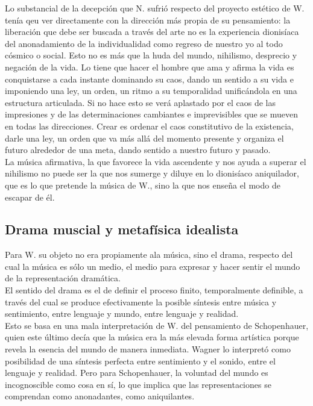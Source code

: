 \documentclass[a4paper, 10pt, twocolumn, spanish]{article}
\begin{document}
Lo substancial de la decepción que N. sufrió respecto del proyecto
estético de W. tenía qeu ver directamente con la dirección más propia
de su pensamiento: la liberación que debe ser buscada a través del
arte no es la experiencia dionisíaca del anonadamiento de la
individualidad como regreso de nuestro yo al todo cósmico o
social. Esto no es más que la huda del mundo, nihilismo, desprecio y
negación de la vida. Lo tiene que hacer el hombre que ama y afirma la
vida es conquistarse a cada instante dominando su caos, dando un
sentido a su vida e imponiendo una ley, un orden, un ritmo a su
temporalidad unificándola en una estructura articulada. Si no hace
esto se verá aplastado por el caos de las impresiones y de las
determinaciones cambiantes e imprevisibles que se mueven en todas las
direcciones. Crear es ordenar el caos constitutivo de la existencia,
darle una ley, un orden que va más allá del momento presente y
organiza el futuro alrededor de una meta, dando sentido a nuestro
futuro y pasado.\\[0pt]
La música afirmativa, la que favorece la vida ascendente y nos ayuda a
superar el nihilismo no puede ser la que nos sumerge y diluye en lo
dionisíaco aniquilador, que es lo que pretende la música de W., sino
la que nos enseña el modo de escapar de él.\\[0pt]

\subsection{Drama muscial y metafísica idealista}
\label{sec:org2f3929f}
Para W. su objeto no era propiamente ala música, sino el drama,
respecto del cual la música es sólo un medio, el medio para expresar y
hacer sentir el mundo de la representación dramática.\\[0pt]

El sentido del drama es el de definir el proceso finito, temporalmente
definible, a través del cual se produce efectivamente la posible
síntesis entre música y sentimiento, entre lenguaje y mundo, entre
lenguaje y realidad.\\[0pt]

Esto se basa en una mala interpretación de W. del pensamiento de
Schopenhauer, quien este último decía que la música era la más elevada
forma artística porque revela la esencia del mundo de manera
inmediata. Wagner lo interpretó como posibilidad de una síntesis
perfecta entre sentimiento y el sonido, entre el lenguaje y
realidad. Pero para Schopenhauer, la voluntad del mundo es
incognoscible como cosa en sí, lo que implica que las representaciones
se comprendan como anonadantes, como aniquilantes.\\[0pt]
\end{document}
